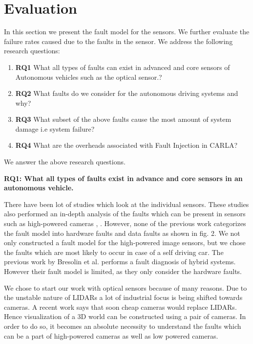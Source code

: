 \section{Evaluation}
In this section we present the fault model for the sensors. We further evaluate the failure rates caused due to the faults in the sensor. We address the following research questions:
\begin{enumerate}
	\item \textbf{RQ1}
	What all types of faults can exist in advanced and core sensors of Autonomous vehicles such as the optical sensor.?
	\item \textbf{RQ2}
	What faults do we consider for the autonomous driving systems and why?
	\item \textbf{RQ3}
	What subset of the above faults cause the most amount of system damage i.e system failure?
	\item \textbf{RQ4}
	What are the overheads associated with Fault Injection in CARLA?
	
\end{enumerate}
We answer the above research questions. 

\vskip 0.1in
\textbf{RQ1: What all types of faults exist in advance and core sensors in an autonomous vehicle.}

There have been lot of studies which look at the individual sensors. These studies also performed an in-depth analysis of the faults which can be present in sensors such as high-powered cameras \cite{5530865}, \cite{inproceedings}. However, none of the previous work categorizes the fault model into hardware faults and data faults as shown in fig. 2. We not only constructed a fault model for the high-powered image sensors, but we chose the faults which are most likely to occur in case of a self driving car. The previous work by Bresolin et al. \cite{inproceedings} performs a fault diagnosis of hybrid systems. However their fault model is limited, as they only consider the hardware faults. 

We chose to start our work with optical sensors because of many reasons. Due to the unstable nature of LIDARs a lot of industrial focus is being shifted towards cameras. A recent work says that soon cheap cameras would replace LIDARs\cite{cheapcamera}. Hence visualization of a 3D world can be constructed using a pair of cameras. In order to do so, it becomes an absolute necessity to understand the faults which can be a part of high-powered cameras as well as low powered cameras. 

